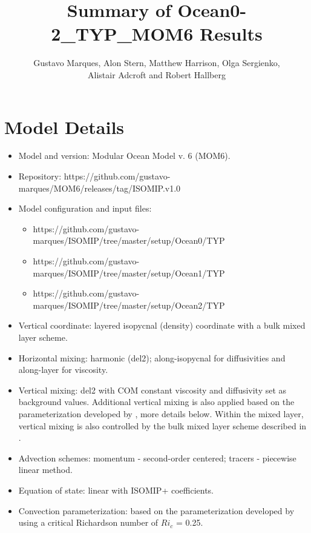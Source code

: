 \documentclass[11pt]{article} %
\title{Summary of Ocean0-2\_TYP\_MOM6 Results}
\author{Gustavo Marques, Alon Stern, Matthew Harrison, Olga Sergienko, \\ Alistair Adcroft and Robert Hallberg}
\begin{document}
\maketitle

\section{Model Details}

\begin{itemize}
\item Model and version: Modular Ocean Model v. 6 (MOM6).
\item Repository: https://github.com/gustavo-marques/MOM6/releases/tag/ISOMIP.v1.0 
\item Model configuration and input files: 
\begin{itemize}
   \item https://github.com/gustavo-marques/ISOMIP/tree/master/setup/Ocean0/TYP
   \item https://github.com/gustavo-marques/ISOMIP/tree/master/setup/Ocean1/TYP
   \item https://github.com/gustavo-marques/ISOMIP/tree/master/setup/Ocean2/TYP
\end{itemize}

\item Vertical coordinate: layered isopycnal (density) coordinate with a bulk mixed layer scheme.

\item Horizontal mixing: harmonic (del2); along-isopycnal for diffusivities and along-layer for viscosity.

\item Vertical mixing: del2 with COM constant viscosity and diffusivity set as background values. Additional vertical mixing is also applied based on the parameterization developed by \cite{Jackson2008}, more details below. Within the mixed layer, vertical mixing is also controlled by the bulk mixed layer scheme described in \cite{Hallberg2003}.

\item Advection schemes: momentum - second-order centered; tracers - piecewise linear method.

\item Equation of state: linear with ISOMIP+ coefficients.

\item Convection parameterization: based on the parameterization developed by \cite{Jackson2008} using a critical Richardson number of $Ri_c$ = 0.25.


\end{itemize}
\end{document}
